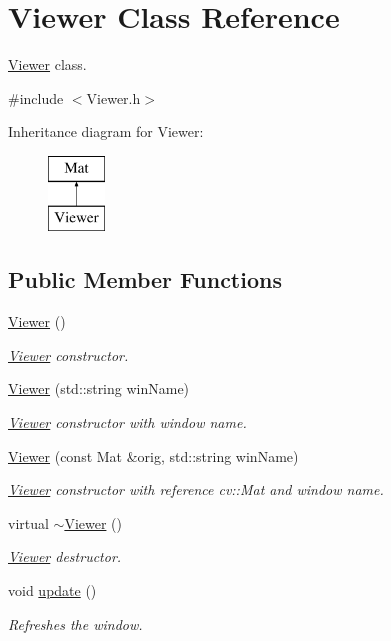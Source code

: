 \hypertarget{classViewer}{}\section{Viewer Class Reference}
\label{classViewer}


\hyperlink{classViewer}{Viewer} class.  




{\ttfamily \#include $<$Viewer.\+h$>$}

Inheritance diagram for Viewer\+:\begin{figure}[H]
\begin{center}
\leavevmode
\includegraphics[height=2.000000cm]{classViewer}
\end{center}
\end{figure}
\subsection*{Public Member Functions}
\begin{DoxyCompactItemize}
\item 
\hyperlink{classViewer_aaedebacb31cba87de6e7d448ed8d6586}{Viewer} ()
\begin{DoxyCompactList}\small\item\em \hyperlink{classViewer}{Viewer} constructor. \end{DoxyCompactList}\item 
\hyperlink{classViewer_af90638063a06dff8f3b020b272216aaf}{Viewer} (std\+::string win\+Name)
\begin{DoxyCompactList}\small\item\em \hyperlink{classViewer}{Viewer} constructor with window name. \end{DoxyCompactList}\item 
\hyperlink{classViewer_a41ffe49f44a4f8fe52cec93c69273ada}{Viewer} (const Mat \&orig, std\+::string win\+Name)
\begin{DoxyCompactList}\small\item\em \hyperlink{classViewer}{Viewer} constructor with reference cv\+::\+Mat and window name. \end{DoxyCompactList}\item 
\hypertarget{classViewer_a324e5a6a1532fe5eac3f3b0e4792b2da}{}virtual \hyperlink{classViewer_a324e5a6a1532fe5eac3f3b0e4792b2da}{$\sim$\+Viewer} ()\label{classViewer_a324e5a6a1532fe5eac3f3b0e4792b2da}

\begin{DoxyCompactList}\small\item\em \hyperlink{classViewer}{Viewer} destructor. \end{DoxyCompactList}\item 
void \hyperlink{classViewer_a7122ce13ef7b396ac8b7e471e4c82693}{update} ()
\begin{DoxyCompactList}\small\item\em Refreshes the window. \end{DoxyCompactList}\end{DoxyCompactItemize}
